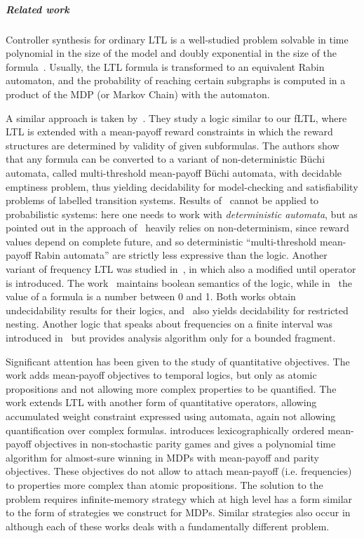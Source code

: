 \documentclass[a4paper,UKenglish]{lipics}
\begin{document}
\subparagraph{Related work}
Controller synthesis for ordinary LTL is a well-studied problem solvable in time polynomial in the size of the model and doubly exponential
in the size of the formula~\cite{BP08}. Usually, the LTL formula is transformed to an equivalent Rabin automaton, and
the probability of reaching certain subgraphs is computed in a product of the MDP (or Markov Chain) with the automaton. 


A similar approach is taken by~\cite{AT12}. They study a logic similar to our fLTL, where LTL is extended with a mean-payoff reward constraints
in which the reward structures are determined by validity of given subformulas. The authors show that any formula can be converted
to a variant of non-deterministic B\"uchi automata, called multi-threshold mean-payoff B\"uchi automata, with
decidable emptiness problem, thus yielding decidability for model-checking and
satisfiability problems of labelled transition systems. Results of~\cite{AT12} cannot be applied
to probabilistic systems:
here one needs to work with {\em deterministic automata},
but as pointed out in \cite[Section 4, Footnote 4]{AT12} the approach of~\cite{AT12} heavily relies on non-determinism, since reward values depend on complete future, and so deterministic ``multi-threshold mean-payoff Rabin automata'' are strictly less expressive than the logic.
Another variant of frequency LTL was studied in~\cite{BDL-tase12,BMM14}, in which also a modified until operator is introduced. 
The work~\cite{BDL-tase12} maintains boolean semantics of the logic, while in~\cite{BMM14} the value of a formula is a number between
0 and 1. Both works obtain undecidability results for their logics, and~\cite{BDL-tase12} also yields decidability for restricted nesting.
Another logic that speaks about frequencies on a finite interval was introduced in~\cite{DBLP:journals/corr/abs-1111-3111} but provides analysis algorithm only for a bounded fragment.

Significant attention has been given to the study of quantitative objectives. The work \cite{boker2011temporal} adds mean-payoff objectives to temporal logics, but only as atomic propositions and not allowing more complex properties to be quantified. 
The work \cite{baier2014weight} extends LTL with another form of quantitative operators, allowing accumulated weight constraint expressed using automata, again not allowing quantification over complex formulas.
\cite{bloem2009better} introduces lexicographically ordered mean-payoff objectives in non-stochastic parity games and \cite{chatterjee2011energy} gives a polynomial time algorithm for almost-sure winning in MDPs with mean-payoff and parity objectives. These objectives do not allow to attach mean-payoff (i.e. frequencies) to properties more complex than atomic propositions. The solution to the problem requires infinite-memory strategy which at high level has a form similar to the form of strategies we construct for MDPs. Similar strategies also occur in \cite{chatterjee2005mean,chatterjee2012games,BFK08} although each of these works deals with a fundamentally different problem.
\end{document}
